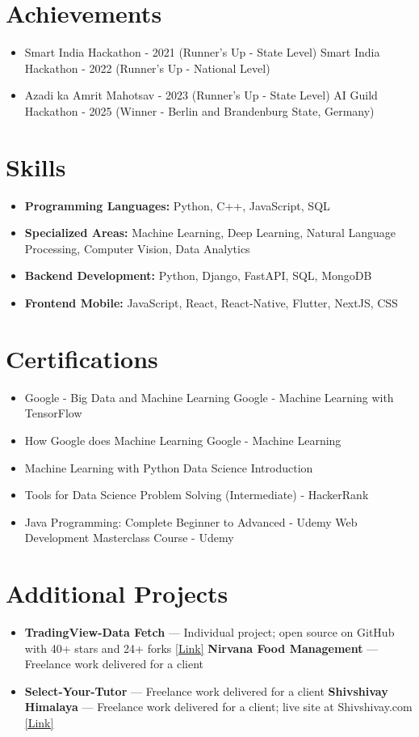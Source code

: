 \documentclass[a4paper,10pt]{article}
\begin{document}
\section*{Achievements}
\begin{itemize}
\item Smart India Hackathon - 2021 (Runner's Up - State Level) \hfill Smart India Hackathon - 2022 (Runner's Up - National Level)
\item Azadi ka Amrit Mahotsav - 2023 (Runner's Up - State Level) \hfill AI Guild Hackathon - 2025 (Winner - Berlin and Brandenburg State, Germany)
\end{itemize}

\section*{Skills}
\begin{itemize}
  \item \textbf{Programming Languages:} Python, C++, JavaScript, SQL
  \item \textbf{Specialized Areas:} Machine Learning, Deep Learning, Natural Language Processing, Computer Vision, Data Analytics
  \item \textbf{Backend Development:} Python, Django, FastAPI, SQL, MongoDB
  \item \textbf{Frontend Mobile:} JavaScript, React, React-Native, Flutter, NextJS, CSS
\end{itemize}

\section*{Certifications}
\begin{itemize}
\item Google - Big Data and Machine Learning \hfill Google - Machine Learning with TensorFlow
\item How Google does Machine Learning \hfill Google - Machine Learning
\item Machine Learning with Python \hfill Data Science Introduction
\item Tools for Data Science \hfill Problem Solving (Intermediate) - HackerRank
\item Java Programming: Complete Beginner to Advanced - Udemy \hfill Web Development Masterclass Course - Udemy
\end{itemize}

\section*{Additional Projects}
\begin{itemize}
\item \textbf{TradingView-Data Fetch} — Individual project; open source on GitHub with 40+ stars and 24+ forks \href{https://github.com/ravalmeet/TradingView}{[Link]} \hfill \textbf{Nirvana Food Management} — Freelance work delivered for a client
\item \textbf{Select-Your-Tutor} — Freelance work delivered for a client \hfill \textbf{Shivshivay Himalaya} — Freelance work delivered for a client; live site at Shivshivay.com \href{Shivshivay.com}{[Link]}
\end{itemize}
\end{document}

